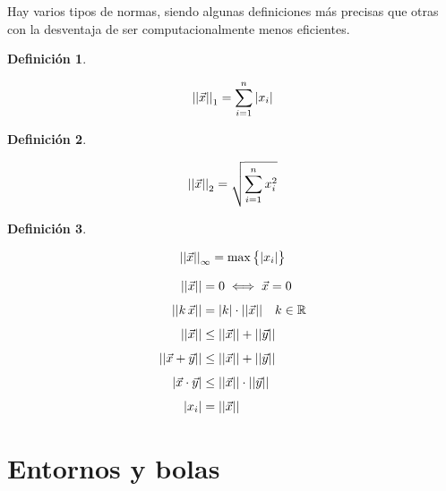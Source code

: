\documentclass[a5paper,12pt,twoside]{book}
\newtheorem{defn}{{Definición}}[chapter]
\begin{document}
Hay varios tipos de normas, siendo algunas definiciones más precisas que otras con la desventaja de ser computacionalmente menos eficientes.

\begin{mdframed}[style=DefinitionFrame]
    \begin{defn}
    \end{defn}
    \begin{equation*}
        {\left|\left| {\Vec{x}} \right|\right|}_1 = \sum_{i=1}^n {\left| {x_i} \right|}
    \end{equation*}
\end{mdframed}

\begin{mdframed}[style=DefinitionFrame]
    \begin{defn}
        \label{defn:norm2}
    \end{defn}
    \begin{equation*}
        {\left|\left| {\Vec{x}} \right|\right|}_2 = \sqrt{\sum_{i=1}^n x_i^2}
    \end{equation*}
\end{mdframed}

\begin{mdframed}[style=DefinitionFrame]
    \begin{defn}
    \end{defn}
    \begin{equation*}
        {\left|\left| {\Vec{x}} \right|\right|}_\infty = \operatorname{max} \big\{ {\left| {x_i} \right|} \big\}
    \end{equation*}
\end{mdframed}



\begin{align*}
    {\left|\left| {\Vec{x}} \right|\right|} &= 0 \iff \Vec{x} = 0
    \\[1ex]
    {\left|\left| {k \, \Vec{x}} \right|\right|} &= {\left| {k} \right|} \cdot {\left|\left| {\Vec{x}} \right|\right|} \quad k\in\mathbb{R}
    \\[1ex]
    {\left|\left| {\Vec{x}} \right|\right|} &\leq {\left|\left| {\Vec{x}} \right|\right|} + {\left|\left| {\Vec{y}} \right|\right|}
    \\[1ex]
    {\left|\left| {\Vec{x}+\Vec{y}} \right|\right|} &\leq {\left|\left| {\Vec{x}} \right|\right|} + {\left|\left| {\Vec{y}} \right|\right|}
    \\[1ex]
    {\left| {\Vec{x} \cdot \Vec{y}} \right|} &\leq {\left|\left| {\Vec{x}} \right|\right|} \cdot {\left|\left| {\Vec{y}} \right|\right|}
    \\[1ex]
    {\left| {x_i} \right|} &= {\left|\left| {\Vec{x}} \right|\right|}
\end{align*}


\section{Entornos y bolas}
\end{document}
